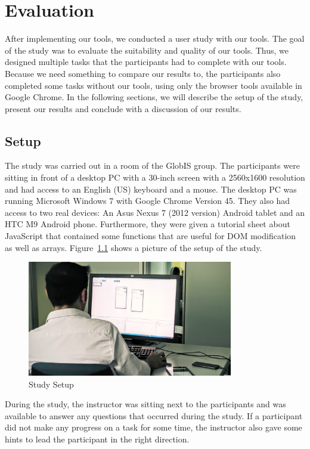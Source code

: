 \chapter{Evaluation}

After implementing our tools, we conducted a user study with our tools. The goal of the study was to evaluate the suitability and quality of our tools. Thus, we designed multiple tasks that the participants had to complete with our tools. Because we need something to compare our results to, the participants also completed some tasks without our tools, using only the browser tools available in Google Chrome. In the following sections, we will describe the setup of the study, present our results and conclude with a discussion of our results.

\section{Setup}

The study was carried out in a room of the GlobIS group. The participants were sitting in front of a desktop PC with a 30-inch screen with a 2560x1600 resolution and had access to an English (US) keyboard and a mouse. The desktop PC was running Microsoft Windows 7 with Google Chrome Version 45. They also had access to two real devices: An Asus Nexus 7 (2012 version) Android tablet and an HTC M9 Android phone. Furthermore, they were given a tutorial sheet about JavaScript that contained some functions that are useful for DOM modification as well as arrays. Figure~\ref{fig:study_setup} shows a picture of the setup of the study.

\begin{figure}[H]
  \centering
    \includegraphics[width=0.8\textwidth]{images/study_setup2.png}
	\caption[Photo: Study setup]{Study Setup}
	\label{fig:study_setup}
\end{figure}

During the study, the instructor was sitting next to the participants and was available to answer any questions that occurred during the study. If a participant did not make any progress on a task for some time, the instructor also gave some hints to lead the participant in the right direction.

